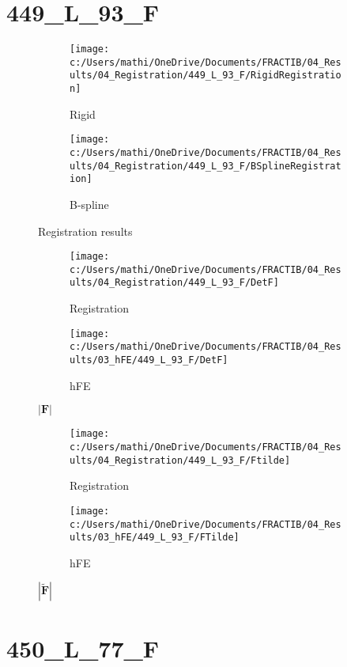 \documentclass{article}%
\begin{document}
\section*{449\_L\_93\_F}%
\label{sec:449L93F}%


\begin{figure}[h!]%
\begin{subfigure}[b]{0.5\linewidth}%
\texttt{[image: c:/Users/mathi/OneDrive/Documents/FRACTIB/04\_Results/04\_Registration/449\_L\_93\_F/RigidRegistration]}%
\caption{Rigid}%
\end{subfigure}%
\begin{subfigure}[b]{0.5\linewidth}%
\texttt{[image: c:/Users/mathi/OneDrive/Documents/FRACTIB/04\_Results/04\_Registration/449\_L\_93\_F/BSplineRegistration]}%
\caption{B{-}spline}%
\end{subfigure}%
\caption{Registration results}%
\end{figure}

%


\begin{figure}[h!]%
\begin{subfigure}[b]{0.5\linewidth}%
\texttt{[image: c:/Users/mathi/OneDrive/Documents/FRACTIB/04\_Results/04\_Registration/449\_L\_93\_F/DetF]}%
\caption{Registration}%
\end{subfigure}%
\begin{subfigure}[b]{0.5\linewidth}%
\texttt{[image: c:/Users/mathi/OneDrive/Documents/FRACTIB/04\_Results/03\_hFE/449\_L\_93\_F/DetF]}%
\caption{hFE}%
\end{subfigure}%
\caption{$|\mathbf{F}|$}%
\end{figure}

%


\begin{figure}[h!]%
\begin{subfigure}[b]{0.5\linewidth}%
\texttt{[image: c:/Users/mathi/OneDrive/Documents/FRACTIB/04\_Results/04\_Registration/449\_L\_93\_F/Ftilde]}%
\caption{Registration}%
\end{subfigure}%
\begin{subfigure}[b]{0.5\linewidth}%
\texttt{[image: c:/Users/mathi/OneDrive/Documents/FRACTIB/04\_Results/03\_hFE/449\_L\_93\_F/FTilde]}%
\caption{hFE}%
\end{subfigure}%
\caption{$|\widetilde{\mathbf{F}}|$}%
\end{figure}

%
\newpage%
\section*{450\_L\_77\_F}%
\label{sec:450L77F}%
\end{document}
